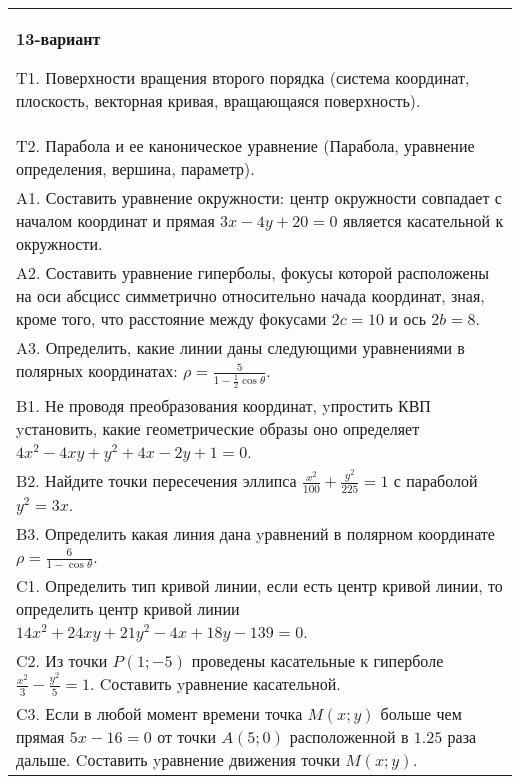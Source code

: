 \documentclass{article}
\begin{document}
\begin{tabular}{m{17cm}}
\textbf{13-вариант}
\newline

T1. Поверхности вращения второго порядка (система координат, плоскость, векторная кривая, вращающаяся поверхность).\\

T2. Парабола и ее каноническое уравнение (Парабола, уравнение определения, вершина, параметр).\\

A1. Составить уравнение окружности: центр окружности совпадает с началом координат и прямая $3x-4y+20=0$ является касательной к окружности.\\

A2. Составить уравнение гиперболы, фокусы которой расположены на оси абсцисс симметрично относительно начада координат, зная, кроме того, что расстояние между фокусами $2c=10$ и ось $2b=8$.\\

A3. Определить, какие линии даны следующими уравнениями в полярных координатах: $\rho=\frac{5}{1-\frac{1}{2}\cos\theta}$.\\

B1. Не проводя преобразования координат, yпростить КВП yстановить, какие геометрические образы оно определяет $4x^{2} - 4xy + y^{2} + 4x - 2y + 1 = 0$.  \\

B2. Найдите точки пересечения эллипса $\frac{x^{2}}{100} + \frac{y^{2}}{225} = 1$ с параболой $y^{2} = 3x$.\\

B3. Определить какая линия дана yравнений в полярном координате $\rho = \frac{6}{1 - \cos\theta}$.  \\

C1. Определить тип кривой линии, если есть центр кривой линии, то определить центр кривой линии $14x^{2}+24xy+21y^{2}-4x+18y-139=0$.  \\

C2. Из точки $P(1;-5)$ проведены касательные к гиперболе $\frac{x^{2}}{3}-\frac{y^{2}}{5}=1$. Cоставить yравнение касательной.\\

C3. Если в любой момент времени точка $M(x;y)$ больше чем прямая $5x-16=0$ от точки $A(5;0)$ расположенной в $1.25$ раза дальше. Cоставить yравнение движения точки $M(x;y)$.  \\

\end{tabular}
\vspace{1cm}
\end{document}

